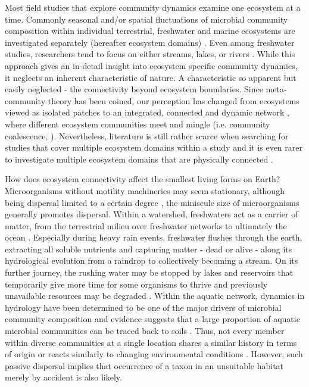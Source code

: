 \documentclass[12pt,a4paper]{article} %
\begin{document}
Most field studies that explore community dynamics examine one ecosystem at a time. Commonly seasonal and/or spatial fluctuations of microbial community composition within individual terrestrial, freshwater and marine ecosystems are investigated separately (hereafter ecosystem domains) \citep{Shigyo2019,Jones2012,Hassell2018,Giovannoni2012}. Even among freshwater studies, researchers tend to focus on either streams, lakes, or rivers \citep{Logue2008}. While this approach gives an in-detail insight into ecosystem specific community dynamics, it neglects an inherent characteristic of nature. A characteristic so apparent but easily neglected - the connectivity beyond ecosystem boundaries. Since meta-community theory has been coined, our perception has changed from ecosystems viewed as isolated patches to an integrated, connected and dynamic network \citep{Leibold2004a}, where different ecosystem communities meet and mingle (i.e. community coalescence, \citet{Mansour2018}). Nevertheless, literature is still rather scarce when searching for studies that cover multiple ecosystem domains within a study \citep{Nemergut2011, Shade2013} and it is even rarer to investigate multiple ecosystem domains that are physically connected \citep{Ruiz-Gonzalez2015, Hauptmann2016, Doherty2017, Gweon2020}.

How does ecosystem connectivity affect the smallest living forms on Earth? Microorganisms without motility machineries may seem stationary, although being dispersal limited to a certain degree \citep{Hanson2012}, the miniscule size of microorganisms generally promotes dispersal. Within a watershed, freshwaters act as a carrier of matter, from the terrestrial milieu over freshwater networks to ultimately the ocean \citep{Mansour2018}. Especially during heavy rain events, freshwater flushes through the earth, extracting all soluble nutrients and capturing matter - dead or alive - along its hydrological evolution from a raindrop to collectively becoming a stream. On its further journey, the rushing water may be stopped by lakes and reservoirs \citep{Ward1983} that temporarily give more time for some organisms to thrive \citep{Logue2010} and previously unavailable resources may be degraded \citep{Catalan2016a}. Within the aquatic network, dynamics in hydrology have been determined to be one of the major drivers of microbial community composition \citep{Nino-Garcia2016} and evidence suggests that a large proportion of aquatic microbial communities can be traced back to soils \citep{Ruiz-Gonzalez2015, Hauptmann2016, Crump2012, Besemer2013, Wisnoski2020}. Thus, not every member within diverse communities at a single location shares a similar history in terms of origin \citep{Nino-Garcia2016, Comte2017} or reacts similarly to changing environmental conditions \citep{Fierer2007}. However, such passive dispersal implies that occurrence of a taxon in an unsuitable habitat merely by accident is also likely.
\end{document}
